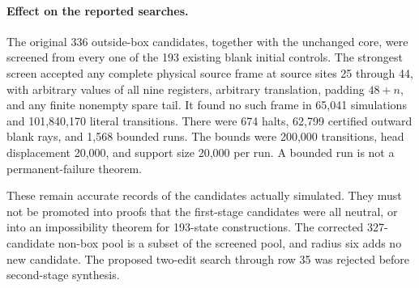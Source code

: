 \paragraph{Effect on the reported searches.}
The original 336 outside-box candidates, together with the unchanged core,
were screened from every one of the 193 existing blank initial controls.
The strongest screen accepted any complete physical source frame at source
sites 25 through 44, with arbitrary values of all nine registers, arbitrary
translation, padding $48+n$, and any finite nonempty spare tail.  It found
no such frame in 65,041 simulations and 101,840,170 literal transitions.
There were 674 halts, 62,799 certified outward blank rays, and 1,568 bounded
runs.  The bounds were 200,000 transitions, head displacement 20,000, and
support size 20,000 per run.  A bounded run is not a permanent-failure theorem.

These remain accurate records of the candidates actually simulated.  They
must not be promoted into proofs that the first-stage candidates were all
neutral, or into an impossibility theorem for 193-state constructions.  The
corrected 327-candidate non-box pool is a subset of the screened pool, and
radius six adds no new candidate.  The proposed two-edit search through
row 35 was rejected before second-stage synthesis.

